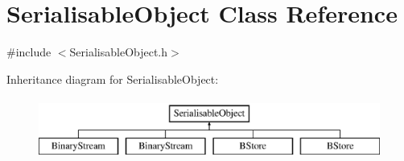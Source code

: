 \hypertarget{classSerialisableObject}{\section{Serialisable\-Object Class Reference}
\label{classSerialisableObject}
}


{\ttfamily \#include $<$Serialisable\-Object.\-h$>$}

Inheritance diagram for Serialisable\-Object\-:\begin{figure}[H]
\begin{center}
\leavevmode
\includegraphics[height=2.000000cm]{classSerialisableObject}
\end{center}
\end{figure}
